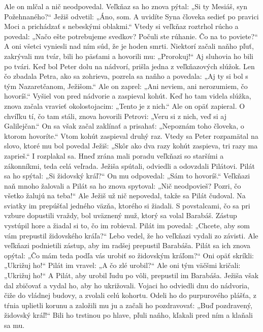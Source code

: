 Ale on mlčal a nič neodpovedal. Veľkňaz sa ho znova pýtal: „Si ty Mesiáš, syn Požehnaného?“ 
Ježiš odvetil: „Áno, som. A uvidíte Syna človeka sedieť po pravici Moci a prichádzať s nebeskými oblakmi.“
Vtedy si veľkňaz roztrhol rúcho a povedal: „Načo ešte potrebujeme svedkov? Počuli ste rúhanie. Čo na to poviete?“ A oni všetci vyniesli nad ním súd, že je hoden smrti.
Niektorí začali naňho pľuť, zakrývali mu tvár, bili ho päsťami a hovorili mu: „Prorokuj!“ Aj sluhovia ho bili po tvári.
\versseparator
Keď bol Peter dolu na nádvorí, prišla jedna z veľkňazových slúžok. Len čo zbadala Petra, ako sa zohrieva, pozrela sa naňho a povedala: „Aj ty si bol s tým Nazaretčanom, Ježišom.“ 
Ale on zaprel: „Ani neviem, ani nerozumiem, čo hovoríš.“ Vyšiel von pred nádvorie a zaspieval kohút. Keď ho tam videla slúžka, znova začala vravieť okolostojacim: „Tento je z nich.“ Ale on opäť zapieral. O chvíľku tí, čo tam stáli, znova hovorili Petrovi: „Veru si z nich, veď si aj Galilejčan.“ On sa však začal zaklínať a prisahať: „Nepoznám toho človeka, o ktorom hovoríte.“ Vtom kohút zaspieval druhý raz. Vtedy sa Peter rozpamätal na slovo, ktoré mu bol povedal Ježiš: „Skôr ako dva razy kohút zaspieva, tri razy ma zaprieš.“ I rozplakal sa.
\versseparator
Hneď zrána mali poradu veľkňazi so staršími a zákonníkmi, teda celá veľrada. Ježiša spútali, odviedli a odovzdali Pilátovi. Pilát sa ho spýtal: „Si židovský kráľ?“ On mu odpovedal: „Sám to hovoríš.“ Veľkňazi naň mnoho žalovali a Pilát sa ho znova spytoval: „Nič neodpovieš? Pozri, čo všetko žalujú na teba!“ Ale Ježiš už nič nepovedal, takže sa Pilát čudoval.
\versseparator
Na sviatky im prepúšťal jedného väzňa, ktorého si žiadali. S povstalcami, čo sa pri vzbure dopustili vraždy, bol uväznený muž, ktorý sa volal Barabáš. Zástup vystúpil hore a žiadal si to, čo im robieval. Pilát im povedal: „Chcete, aby som vám prepustil židovského kráľa?“ Lebo vedel, že ho veľkňazi vydali zo závisti. Ale veľkňazi podnietili zástup, aby im radšej prepustil Barabáša. Pilát sa ich znova opýtal: „Čo mám teda podľa vás urobiť so židovským kráľom?“ Oni opäť skríkli: „Ukrižuj ho!“ Pilát im vravel: „A čo zlé urobil?“ Ale oni tým väčšmi kričali: „Ukrižuj ho!“ A Pilát, aby urobil ľudu po vôli, prepustil im Barabáša. Ježiša však dal zbičovať a vydal ho, aby ho ukrižovali.
\versseparator
Vojaci ho odviedli dnu do nádvoria, čiže do vládnej budovy, a zvolali celú kohortu. Odeli ho do purpurového plášťa, z tŕnia uplietli korunu a založili mu ju a začali ho pozdravovať: „Buď pozdravený, židovský kráľ!“ Bili ho trstinou po hlave, pľuli naňho, kľakali pred ním a klaňali sa mu.
